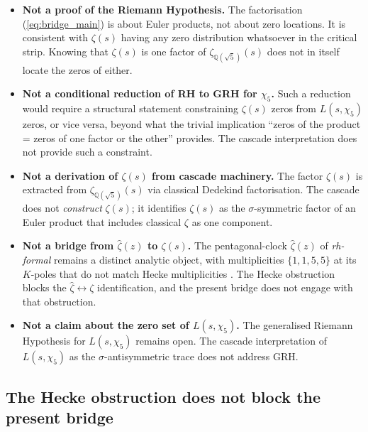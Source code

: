 \documentclass[11pt,a4paper]{article}
\theoremstyle{definition}
\theoremstyle{remark}
\begin{document}
\begin{itemize}
\item \textbf{Not a proof of the Riemann Hypothesis.} The factorisation
      (\ref{eq:bridge_main}) is about Euler products, not about zero
      locations. It is consistent with $\zeta(s)$ having any zero
      distribution whatsoever in the critical strip. Knowing that
      $\zeta(s)$ is one factor of $\zeta_{\mathbb{Q}(\sqrt{5})}(s)$
      does not in itself locate the zeros of either.
\item \textbf{Not a conditional reduction of RH to GRH for $\chi_5$.}
      Such a reduction would require a structural statement constraining
      $\zeta(s)$ zeros from $L(s, \chi_5)$ zeros, or vice versa, beyond
      what the trivial implication ``zeros of the product = zeros of one
      factor or the other'' provides. The cascade interpretation does
      not provide such a constraint.
\item \textbf{Not a derivation of $\zeta(s)$ from cascade machinery.}
      The factor $\zeta(s)$ is extracted from $\zeta_{\mathbb{Q}(\sqrt{5})}(s)$
      via classical Dedekind factorisation. The cascade does not
      \emph{construct} $\zeta(s)$; it identifies $\zeta(s)$ as the
      $\sigma$-symmetric factor of an Euler product that includes
      classical $\zeta$ as one component.
\item \textbf{Not a bridge from $\hat{\zeta}(z)$ to $\zeta(s)$.} The
      pentagonal-clock $\hat{\zeta}(z)$ of \emph{rh-formal} remains a
      distinct analytic object, with multiplicities $\{1,1,5,5\}$ at its
      $K$-poles that do not match Hecke multiplicities
      \cite{rhFormalSmart}. The Hecke obstruction blocks the
      $\hat{\zeta} \leftrightarrow \zeta$ identification, and the
      present bridge does not engage with that obstruction.
\item \textbf{Not a claim about the zero set of $L(s, \chi_5)$.} The
      generalised Riemann Hypothesis for $L(s, \chi_5)$ remains open.
      The cascade interpretation of $L(s, \chi_5)$ as the
      $\sigma$-antisymmetric trace does not address GRH.
\end{itemize}

\subsection{The Hecke obstruction does not block the present bridge}
\end{document}
